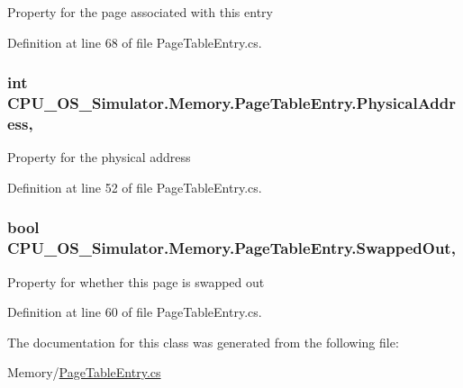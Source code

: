 Property for the page associated with this entry 



Definition at line 68 of file Page\+Table\+Entry.\+cs.

\hypertarget{class_c_p_u___o_s___simulator_1_1_memory_1_1_page_table_entry_ab52b7572557f81a63006101b4b348f8f}{}
\subsubsection[{Physical\+Address}]{\setlength{\rightskip}{0pt plus 5cm}int C\+P\+U\+\_\+\+O\+S\+\_\+\+Simulator.\+Memory.\+Page\+Table\+Entry.\+Physical\+Address\hspace{0.3cm}{\ttfamily [get]}, {\ttfamily [set]}}\label{class_c_p_u___o_s___simulator_1_1_memory_1_1_page_table_entry_ab52b7572557f81a63006101b4b348f8f}


Property for the physical address 



Definition at line 52 of file Page\+Table\+Entry.\+cs.

\hypertarget{class_c_p_u___o_s___simulator_1_1_memory_1_1_page_table_entry_a334eb63f388b19d1cf6907970f29e204}{}
\subsubsection[{Swapped\+Out}]{\setlength{\rightskip}{0pt plus 5cm}bool C\+P\+U\+\_\+\+O\+S\+\_\+\+Simulator.\+Memory.\+Page\+Table\+Entry.\+Swapped\+Out\hspace{0.3cm}{\ttfamily [get]}, {\ttfamily [set]}}\label{class_c_p_u___o_s___simulator_1_1_memory_1_1_page_table_entry_a334eb63f388b19d1cf6907970f29e204}


Property for whether this page is swapped out 



Definition at line 60 of file Page\+Table\+Entry.\+cs.



The documentation for this class was generated from the following file\+:\begin{DoxyCompactItemize}
\item 
Memory/\hyperlink{_page_table_entry_8cs}{Page\+Table\+Entry.\+cs}\end{DoxyCompactItemize}
